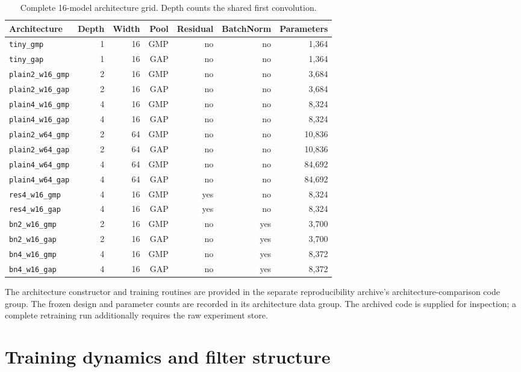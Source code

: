 \documentclass[pdflatex,sn-basic]{sn-jnl}
\begin{document}
\begin{table}[h]
\caption{Complete 16-model architecture grid. Depth counts the shared first convolution.}
\label{tab:supp-architecture-grid}
\centering
\scriptsize
\setlength{\tabcolsep}{3pt}
\begin{tabular}{lrrrrrr}
\toprule
Architecture & Depth & Width & Pool & Residual & BatchNorm & Parameters \\
\midrule
\texttt{tiny\_gmp} & 1 & 16 & GMP & no & no & 1,364 \\
\texttt{tiny\_gap} & 1 & 16 & GAP & no & no & 1,364 \\
\texttt{plain2\_w16\_gmp} & 2 & 16 & GMP & no & no & 3,684 \\
\texttt{plain2\_w16\_gap} & 2 & 16 & GAP & no & no & 3,684 \\
\texttt{plain4\_w16\_gmp} & 4 & 16 & GMP & no & no & 8,324 \\
\texttt{plain4\_w16\_gap} & 4 & 16 & GAP & no & no & 8,324 \\
\texttt{plain2\_w64\_gmp} & 2 & 64 & GMP & no & no & 10,836 \\
\texttt{plain2\_w64\_gap} & 2 & 64 & GAP & no & no & 10,836 \\
\texttt{plain4\_w64\_gmp} & 4 & 64 & GMP & no & no & 84,692 \\
\texttt{plain4\_w64\_gap} & 4 & 64 & GAP & no & no & 84,692 \\
\texttt{res4\_w16\_gmp} & 4 & 16 & GMP & yes & no & 8,324 \\
\texttt{res4\_w16\_gap} & 4 & 16 & GAP & yes & no & 8,324 \\
\texttt{bn2\_w16\_gmp} & 2 & 16 & GMP & no & yes & 3,700 \\
\texttt{bn2\_w16\_gap} & 2 & 16 & GAP & no & yes & 3,700 \\
\texttt{bn4\_w16\_gmp} & 4 & 16 & GMP & no & yes & 8,372 \\
\texttt{bn4\_w16\_gap} & 4 & 16 & GAP & no & yes & 8,372 \\
\bottomrule
\end{tabular}
\end{table}

The architecture constructor and training routines are provided in the separate reproducibility archive's architecture-comparison code group. The frozen design and parameter counts are recorded in its architecture data group. The archived code is supplied for inspection; a complete retraining run additionally requires the raw experiment store.

\section{Training dynamics and filter structure}\label{supp:filter-dynamics}
\end{document}
